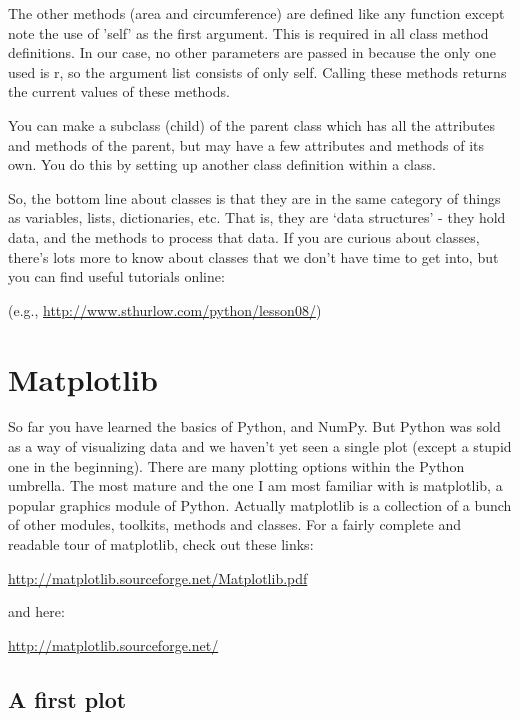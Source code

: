 \documentclass[11pt]{book}
\begin{document}
{The other methods ({\color{blue}area} and {\color{blue}circumference}) are defined like any function except note the use of 'self' as the first argument.  This is required in all class method definitions.  In our case, no other parameters are passed in because the only one used is {\color{blue}r}, so the argument list consists of only {\color{blue}self}.  Calling these methods returns the current values of these methods.   

You can make a subclass (child) of the parent class which has all the attributes and methods of the parent, but may have a few attributes and methods of its own.   You do this by setting up another class definition within a class.  

So, the bottom line about classes is that they are  in the same category of things as variables, lists, dictionaries, etc. That is, they are  `data structures' - they hold data, and the methods to process that data.
If you are curious about classes, there's lots more to know about classes that we don't have time to get into, but you can find useful tutorials online:

 (e.g., \url{http://www.sthurlow.com/python/lesson08/})
 


\section{Matplotlib}

So far you have learned the basics of Python, and NumPy.  But Python was sold as a way of visualizing data and we haven't yet seen a single plot (except a stupid one in the beginning). There are many plotting options within the Python umbrella. The most mature and the one I am most familiar with is {\color{blue}matplotlib}, a popular  graphics module of Python.  
Actually  {\color{blue}matplotlib} is a collection of a bunch of other modules, toolkits, methods and  classes.   For a fairly complete and readable tour of matplotlib, check out these links:  
 
\url{http://matplotlib.sourceforge.net/Matplotlib.pdf}

\noindent
and here:

\url{http://matplotlib.sourceforge.net/}




\subsection{A first plot}

}
\end{document}
